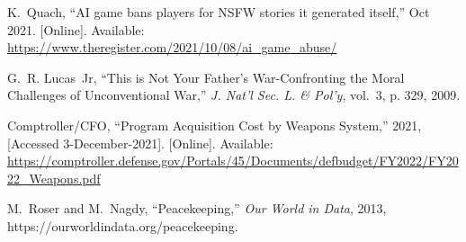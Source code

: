 \documentclass[11pt,dvipdfm]{article}
\begin{document}
\begin{thebibliography}{10}
\begin{small}
K.~Quach, ``{AI} game bans players for {NSFW} stories it generated itself,''
  Oct 2021. [Online]. Available:
  \url{https://www.theregister.com/2021/10/08/ai_game_abuse/}

G.~R. Lucas~Jr, ``{This is Not Your Father's War-Confronting the Moral
  Challenges of Unconventional War},'' \emph{J. Nat'l Sec. L. \& Pol'y},
  vol.~3, p. 329, 2009.

{Comptroller/CFO}, ``{Program Acquisition Cost by Weapons System},'' 2021,
  [Accessed 3-December-2021]. [Online]. Available:
  \url{https://comptroller.defense.gov/Portals/45/Documents/defbudget/FY2022/FY2022_Weapons.pdf}

M.~Roser and M.~Nagdy, ``Peacekeeping,'' \emph{Our World in Data}, 2013,
  https://ourworldindata.org/peacekeeping.


\end{small}
\end{thebibliography}
\end{document}
